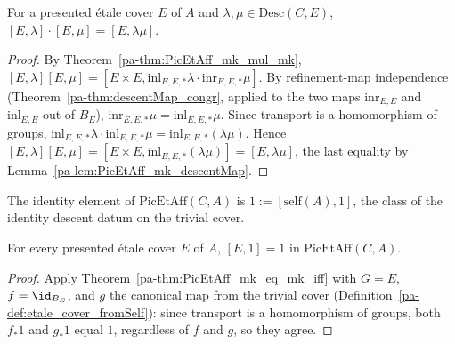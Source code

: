 \begin{theorem}
  \label{pa-thm:PicEtAff_mk_mul_mk_same}
  \leanok

  For a presented \'etale cover \(E\) of \(A\) and \(\lambda, \mu \in \mathrm{Desc}(C,E)\),
  \([E,\lambda] \cdot [E,\mu] = [E, \lambda \mu]\).
\end{theorem}
\begin{proof}
  \leanok
  By Theorem~\ref{pa-thm:PicEtAff_mk_mul_mk}, \([E,\lambda][E,\mu] = [E \times E,
  \mathrm{inl}_{E,E,*}\lambda \cdot \mathrm{inr}_{E,E,*}\mu]\). By refinement-map independence
  (Theorem~\ref{pa-thm:descentMap_congr}, applied to the two maps \(\mathrm{inr}_{E,E}\) and
  \(\mathrm{inl}_{E,E}\) out of \(B_E\)), \(\mathrm{inr}_{E,E,*}\mu = \mathrm{inl}_{E,E,*}\mu\).
  Since transport is a homomorphism of groups,
  \(\mathrm{inl}_{E,E,*}\lambda \cdot \mathrm{inl}_{E,E,*}\mu = \mathrm{inl}_{E,E,*}(\lambda
  \mu)\). Hence \([E,\lambda][E,\mu] = [E \times E, \mathrm{inl}_{E,E,*}(\lambda\mu)] =
  [E,\lambda\mu]\), the last equality by Lemma~\ref{pa-lem:PicEtAff_mk_descentMap}.
\end{proof}

\begin{definition}[Identity]
  \label{pa-def:PicEtAff_one}
  \leanok

  The identity element of \(\mathrm{PicEtAff}(C,A)\) is \(1 := [\mathrm{self}(A), 1]\), the
  class of the identity descent datum on the trivial cover.
\end{definition}

\begin{theorem}
  \label{pa-thm:PicEtAff_mk_one}
  \leanok

  For every presented \'etale cover \(E\) of \(A\), \([E,1] = 1\) in \(\mathrm{PicEtAff}(C,A)\).
\end{theorem}
\begin{proof}
  \leanok
  Apply Theorem~\ref{pa-thm:PicEtAff_mk_eq_mk_iff} with \(G = E\), \(f = \id_{B_E}\), and \(g\)
  the canonical map from the trivial cover (Definition~\ref{pa-def:etale_cover_fromSelf}): since
  transport is a homomorphism of groups, both \(f_{*}1\) and \(g_{*}1\) equal \(1\), regardless
  of \(f\) and \(g\), so they agree.
\end{proof}

